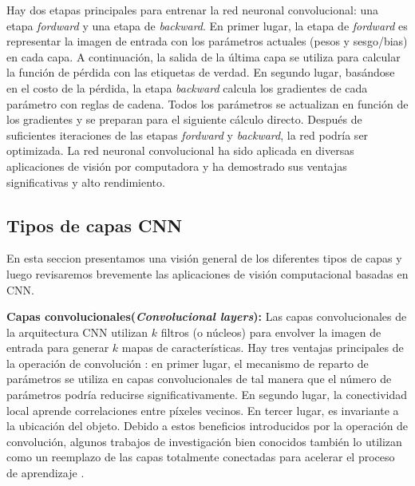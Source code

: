 Hay dos etapas principales para entrenar la red neuronal convolucional: una etapa \textit{fordward}  y una etapa de \textit{backward}.  En primer lugar, la etapa de \textit{fordward} es representar la imagen de entrada con los parámetros actuales (pesos y sesgo/bias) en cada capa. A continuación, la salida de la última capa se utiliza para calcular la función de pérdida con las etiquetas de verdad. En segundo lugar, basándose en el costo de la pérdida, la etapa \textit{backward} calcula los gradientes de cada parámetro con reglas de cadena. Todos los parámetros se actualizan en función de los gradientes y se preparan para el siguiente cálculo directo. Después de suficientes iteraciones de las etapas \textit{fordward} y \textit{backward}, la red podría ser optimizada. La red neuronal convolucional ha sido aplicada en diversas aplicaciones de visión por computadora y ha demostrado sus ventajas significativas y alto rendimiento.

\subsection {Tipos de capas CNN}

En esta seccion presentamos una visión general de los diferentes tipos de capas y luego revisaremos brevemente las aplicaciones de visión computacional basadas en CNN.

\textbf{Capas convolucionales(\textit{Convolucional layers}):} Las capas convolucionales de la arquitectura CNN utilizan $k$ filtros (o núcleos) para envolver la imagen de entrada para generar $k$ mapas de características. Hay tres ventajas principales de la operación de convolución \cite{Zeiler}: en primer lugar, el mecanismo de reparto de parámetros se utiliza en capas convolucionales de tal manera que el número de parámetros podría reducirse significativamente. En segundo lugar, la conectividad local aprende correlaciones entre píxeles vecinos. En tercer lugar, es invariante a la ubicación del objeto. Debido a estos beneficios introducidos por la operación de convolución, algunos trabajos de investigación bien conocidos también lo utilizan como un reemplazo de las capas totalmente conectadas para acelerar el proceso de aprendizaje \cite{Szegedy,Oquab}.

